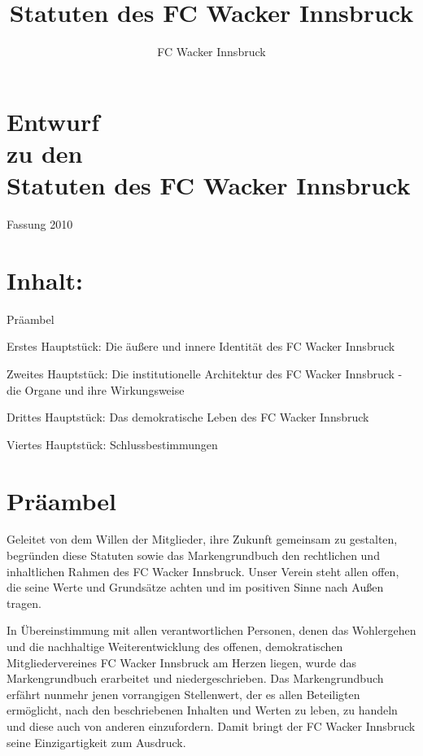 \documentclass[10pt,a4paper]{article}
\author{FC Wacker Innsbruck}
\title{Statuten des FC Wacker Innsbruck}
\begin{document}
\setlength{\parskip}{25pt}
\setcounter{secnumdepth}{0}

\centering
\itshape

\section{Entwurf \\ zu den \\ Statuten des FC Wacker Innsbruck}

Fassung 2010

\vspace{5ex}

\section{Inhalt:}

\vspace{10ex}

Präambel

Erstes Hauptstück: Die äußere und innere Identität des FC Wacker Innsbruck

Zweites Hauptstück: Die institutionelle Architektur des FC Wacker Innsbruck - die Organe und ihre Wirkungsweise

Drittes Hauptstück: Das demokratische Leben des FC Wacker Innsbruck

Viertes Hauptstück: Schlussbestimmungen

\clearpage

\section{Präambel}

\flushleft
\vspace{10ex}


Geleitet von dem Willen der Mitglieder, ihre Zukunft gemeinsam zu gestalten, begründen diese Statuten sowie das Markengrundbuch den rechtlichen und inhaltlichen Rahmen des FC Wacker Innsbruck.
Unser Verein steht allen offen, die seine Werte und Grundsätze achten und im positiven Sinne nach Außen tragen.

In Übereinstimmung mit allen verantwortlichen Personen, denen das Wohlergehen und die nachhaltige Weiterentwicklung des offenen, demokratischen Mitgliedervereines FC Wacker Innsbruck am Herzen liegen, wurde das Markengrundbuch erarbeitet und niedergeschrieben.
Das Markengrundbuch erfährt nunmehr jenen vorrangigen Stellenwert, der es allen Beteiligten ermöglicht, nach den beschriebenen Inhalten und Werten zu leben, zu handeln und diese auch von anderen einzufordern.
Damit bringt der FC Wacker Innsbruck seine Einzigartigkeit zum Ausdruck.
\end{document}
